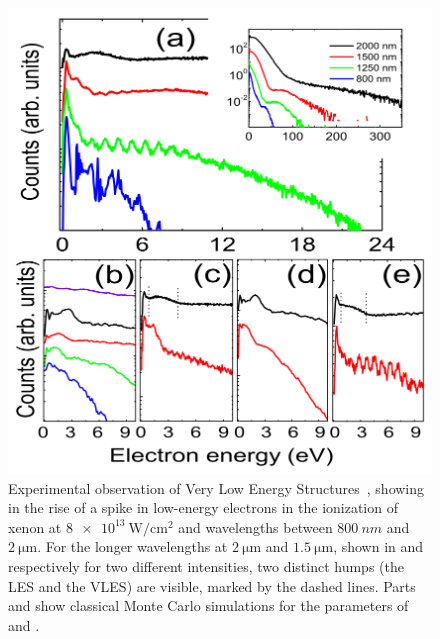 \begin{figure}[t!]
  \centering
  \subfigure{\label{f6-quan-original-figure-a}}
  \subfigure{\label{f6-quan-original-figure-b}}
  \subfigure{\label{f6-quan-original-figure-c}}
  \subfigure{\label{f6-quan-original-figure-d}}
  \subfigure{\label{f6-quan-original-figure-e}}
  \includegraphics[scale=0.8]{6-LES/Figures/figure6B.png}
  \caption[
  Experimental observation of Very Low Energy Structures by W. Quan et al.
  ]{
  Experimental observation of Very Low Energy Structures~\cite{VLES_initial}, showing in \protect{} the rise of a spike in low-energy electrons in the ionization of xenon at $\SI{8e13}{\watt/\centi\meter^2}$ and wavelengths between $\SI{800}{nm}$ and $\SI{2}{\micro\meter}$. For the longer wavelengths at $\SI{2}{\micro\meter}$ and $\SI{1.5}{\micro\meter}$, shown in \protect{} and \protect{} respectively for two different intensities, two distinct humps (the LES and the VLES) are visible, marked by the dashed lines.  
  Parts \protect{} and \protect{} show classical Monte Carlo simulations for the parameters of \protect{} and \protect{}.
}
\end{figure}
